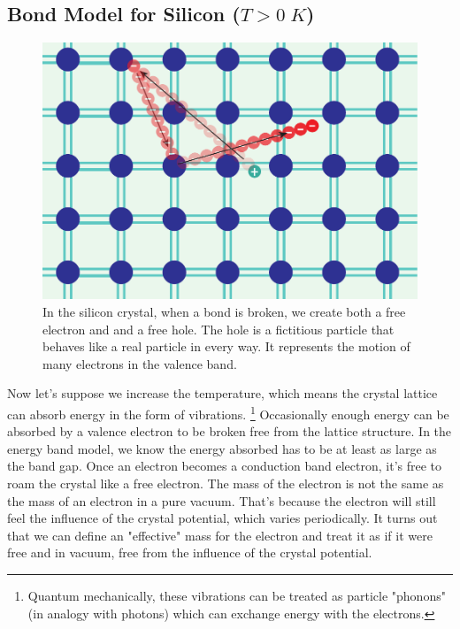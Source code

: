 \subsection{Bond Model for Silicon (\texorpdfstring{$T>0\;K$}{T > 0K})}
\begin{figure}[tb]
\centering
\includegraphics[width=.5\columnwidth]{silicon_broken_bond_motion}
\caption{In the silicon crystal, when a bond is broken, we create both a free electron and and a free hole.  The hole is a fictitious particle that behaves like a real particle in every way. It represents the motion of many electrons in the valence band.}
\label{fig:silicon_broken_bond}
\end{figure}
Now let's suppose we increase the temperature, which means the crystal lattice can absorb energy in the form of vibrations.  \footnote{Quantum mechanically, these vibrations can be treated as particle "phonons" (in analogy with photons) which can exchange energy with the electrons.}  Occasionally enough energy can be absorbed by a valence electron to be broken free from the lattice structure.  In the energy band model, we know the energy absorbed has to be at least as large as the band gap.  Once an electron becomes a conduction band electron, it's free to roam the crystal like a free electron.  The mass of the electron is not the same as the mass of an electron in a pure vacuum.  That's because the electron will still feel the influence of the crystal potential, which varies periodically.  It turns out that we can define an "effective" mass for the electron and treat it as if it were free and in vacuum, free from the influence of the crystal potential. 
